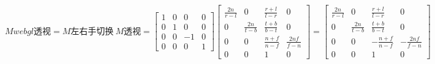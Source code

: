 $$
Mwebgl透视 =
M左右手切换\ M透视 =
\begin{bmatrix}
  1 & 0 & 0 & 0 \\
  0 & 1 & 0 & 0 \\
  0 & 0 & -1 & 0 \\
  0 & 0 & 0 & 1
\end{bmatrix}
\begin{bmatrix}
  \frac{2n}{r-l} & 0 & \frac{r+l}{l-r} & 0 \\
  0 & \frac{2n}{t-b} & \frac{t+b}{b-t} & 0 \\
  0 & 0 & \frac{n + f}{n-f} & \frac{2nf}{f-n} \\
  0 & 0 & 1 & 0
\end{bmatrix}
=
\begin{bmatrix}
  \frac{2n}{r-l} & 0 & \frac{r+l}{l-r} & 0 \\
  0 & \frac{2n}{t-b} & \frac{t+b}{b-t} & 0 \\
  0 & 0 & -\frac{n + f}{n-f} & -\frac{2nf}{f-n} \\
  0 & 0 & 1 & 0
\end{bmatrix}
$$